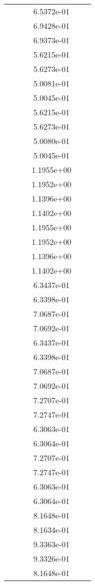 \begin{xltabular}{\textwidth}{r|rS[table-format=1.3e+2]S[table-format=1.4e+2]S[table-format=1.4e+2]S[table-format=-1.5]}
&  &  & 6.5372e-01 & & \\
&  &  & 6.9428e-01 & & \\
&  &  & 6.9373e-01 & & \\
&  &  & 5.6215e-01 & & \\
&  &  & 5.6273e-01 & & \\
&  &  & 5.0081e-01 & & \\
&  &  & 5.0045e-01 & & \\
&  &  & 5.6215e-01 & & \\
&  &  & 5.6273e-01 & & \\
&  &  & 5.0080e-01 & & \\
&  &  & 5.0045e-01 & & \\
&  &  & 1.1955e+00 & & \\
&  &  & 1.1952e+00 & & \\
&  &  & 1.1396e+00 & & \\
&  &  & 1.1402e+00 & & \\
&  &  & 1.1955e+00 & & \\
&  &  & 1.1952e+00 & & \\
&  &  & 1.1396e+00 & & \\
&  &  & 1.1402e+00 & & \\
&  &  & 6.3437e-01 & & \\
&  &  & 6.3398e-01 & & \\
&  &  & 7.0687e-01 & & \\
&  &  & 7.0692e-01 & & \\
&  &  & 6.3437e-01 & & \\
&  &  & 6.3398e-01 & & \\
&  &  & 7.0687e-01 & & \\
&  &  & 7.0692e-01 & & \\
&  &  & 7.2707e-01 & & \\
&  &  & 7.2747e-01 & & \\
&  &  & 6.3063e-01 & & \\
&  &  & 6.3064e-01 & & \\
&  &  & 7.2707e-01 & & \\
&  &  & 7.2747e-01 & & \\
&  &  & 6.3063e-01 & & \\
&  &  & 6.3064e-01 & & \\
&  &  & 8.1648e-01 & & \\
&  &  & 8.1634e-01 & & \\
&  &  & 9.3363e-01 & & \\
&  &  & 9.3326e-01 & & \\
&  &  & 8.1648e-01 & & \\

\end{xltabular}
